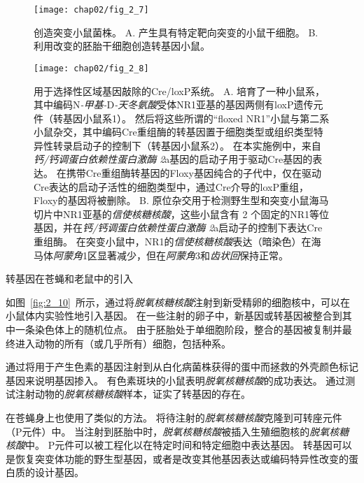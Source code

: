 \begin{figure}[htbp]
	\centering
	\texttt{[image: chap02/fig\_2\_7]}
	\caption{创造突变小鼠菌株\cite{alberts2017molecular}。
		A. 产生具有特定靶向突变的小鼠干细胞。
		B. 利用改变的胚胎干细胞创造转基因小鼠。}
	\label{fig:2_7}
\end{figure}


\begin{figure}[htbp]
	\centering
	\texttt{[image: chap02/fig\_2\_8]}
	\caption{用于选择性区域基因敲除的Cre/loxP系统。
		A. 培育了一种小鼠系，其中编码N\textit{-甲基-}D\textit{-天冬氨酸}受体NR1亚基的基因两侧有loxP遗传元件（转基因小鼠系1）。
		然后将这些所谓的“floxed NR1”小鼠与第二系小鼠杂交，其中编码Cre重组酶的转基因置于细胞类型或组织类型特异性转录启动子的控制下（转基因小鼠系2）。
		在本实施例中，来自\textit{钙/钙调蛋白依赖性蛋白激酶 2}a基因的启动子用于驱动Cre基因的表达。
		在携带Cre重组酶转基因的Floxy基因纯合的子代中，仅在驱动Cre表达的启动子活性的细胞类型中，通过Cre介导的loxP重组，Floxy的基因将被删除。
		B. 原位杂交用于检测野生型和突变小鼠海马切片中NR1亚基的\textit{信使核糖核酸}，这些小鼠含有 2 个固定的NR1等位基因，并在\textit{钙/钙调蛋白依赖性蛋白激酶 2}a启动子的控制下表达Cre重组酶。
		在突变小鼠中，NR1的\textit{信使核糖核酸}表达（暗染色）在海马体\textit{阿蒙角}1区显著减少，但在\textit{阿蒙角}3和\textit{齿状回}保持正常\cite{tsien1996essential}。}
	\label{fig:2_8}
\end{figure}



\begin{proposition}[神经解剖学导航术语] \label{box:2_3}
	
	\quad \quad 转基因在苍蝇和老鼠中的引入
	
	\quad \quad 如图~\ref{fig:2_10}~所示，通过将\textit{脱氧核糖核酸}注射到新受精卵的细胞核中，可以在小鼠体内实验性地引入基因。
	在一些注射的卵子中，新基因或转基因被整合到其中一条染色体上的随机位点。
	由于胚胎处于单细胞阶段，整合的基因被复制并最终进入动物的所有（或几乎所有）细胞，包括种系。
	
	\quad \quad 通过将用于产生色素的基因注射到从白化病菌株获得的蛋中而拯救的外壳颜色标记基因来说明基因掺入。
	有色素斑块的小鼠表明\textit{脱氧核糖核酸}的成功表达。
	通过测试注射动物的\textit{脱氧核糖核酸}样本，证实了转基因的存在。
	
	\quad \quad 在苍蝇身上也使用了类似的方法。
	将待注射的\textit{脱氧核糖核酸}克隆到可转座元件（P元件）中。
	当注射到胚胎中时，\textit{脱氧核糖核酸}被插入生殖细胞核的\textit{脱氧核糖核酸}中。
	P元件可以被工程化以在特定时间和特定细胞中表达基因。
	转基因可以是恢复突变体功能的野生型基因，或者是改变其他基因表达或编码特异性改变的蛋白质的设计基因。
	
\end{proposition}


